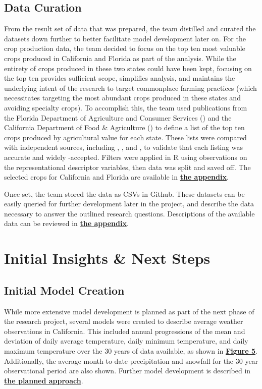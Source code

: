 \documentclass{article}
\begin{document}
\subsection{Data Curation}
\hspace{.5cm}From the result set of data that was prepared, the team distilled and curated the datasets down further to better facilitate model development later on. For the crop production data, the team decided to focus on the top ten most valuable crops produced in California and Florida as part of the analysis. While the entirety of crops produced in these two states could have been kept, focusing on the top ten provides sufficient scope, simplifies analysis, and maintains the underlying intent of the research to target commonplace farming practices (which necessitates targeting the most abundant crops produced in these states and avoiding specialty crops). To accomplish this, the team used publications from the Florida Department of Agriculture and Consumer Services (\citeyear{FL-Ag}) and the California Department of Food \& Agriculture (\citeyear{CA-Ag}) to define a list of the top ten crops produced by agricultural value for each state. These lists were compared with independent sources, including \citep{Stacker}, \citep{FGS}, and \citep{FarmingWork.com}, to validate that each listing was accurate and widely -accepted. Filters were applied in R using observations on the representational descriptor variables, then data was split and saved off. The selected crops for California and Florida are available in \textbf{\hyperref[sec:choices]{the appendix}}.

Once set, the team stored the data as CSVs in Github. These datasets can be easily queried for further development later in the project, and describe the data necessary to answer the outlined research questions. Descriptions of the available data can be reviewed in \textbf{\hyperref[sec:curated]{the appendix}}.

\section{Initial Insights \& Next Steps}

\subsection{Initial Model Creation}
\hspace{.5cm}While more extensive model development is planned as part of the next phase of the research project, several models were created to describe average weather observations in California. This included annual progressions of the mean and deviation of daily average temperature, daily minimum temperature, and daily maximum temperature over the 30 years of data available, as shown in \textbf{\hyperref[sec:dataviz1]{Figure 5}}. Additionally, the average month-to-date precipitation and snowfall for the 30-year observational period are also shown. Further model development is described in \textbf{\hyperref[sec:approach]{the planned approach}}.
\end{document}
